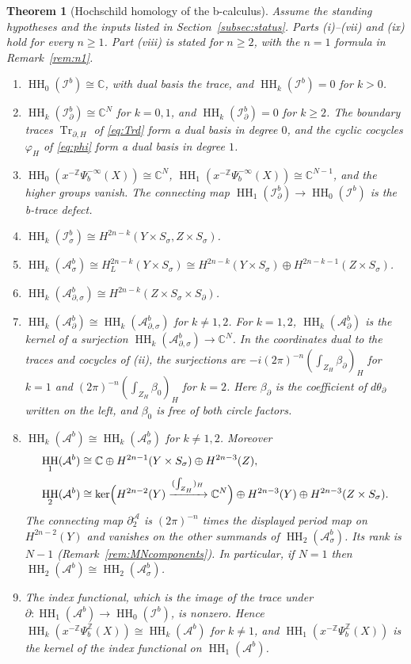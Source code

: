 \documentclass[11pt,oneside,reqno]{article}
\DeclareMathOperator{\HH}{HH}
\newcommand{\C}{\mathbb C}
\newcommand{\Z}{\mathbb Z}
\DeclareMathOperator{\Tr}{Tr}
\newcommand{\Ib}{\mathcal I^b}
\newcommand{\Idb}{\mathcal I^b_\partial}
\newcommand{\Isb}{\mathcal I^b_\sigma}
\newcommand{\Ab}{\mathcal A^b}
\newcommand{\Asb}{\mathcal A^b_\sigma}
\newcommand{\Adb}{\mathcal A^b_\partial}
\newcommand{\Adsb}{\mathcal A^b_{\partial,\sigma}}
\theoremstyle{plain}
\newtheorem{theorem}{Theorem}[section]
\theoremstyle{definition}
\theoremstyle{remark}
\begin{document}
\begin{theorem}[Hochschild homology of the b-calculus]\label{thm:full}
Assume the standing hypotheses and the inputs listed in
Section~\ref{subsec:status}. Parts (i)--(vii) and (ix) hold for every \(n\geq1\).
Part (viii) is stated for \(n\geq2\), with the \(n=1\) formula in
Remark~\ref{rem:n1}.
\begin{enumerate}
\item[(i)] \(\HH_0(\Ib)\cong\C\), with dual basis the trace, and
\(\HH_k(\Ib)=0\) for \(k>0\).
\item[(ii)] \(\HH_k(\Idb)\cong\C^N\) for \(k=0,1\), and \(\HH_k(\Idb)=0\)
for \(k\geq2\). The boundary traces \(\Tr_{\partial,H}\) of \eqref{eq:Trd}
form a dual basis in degree \(0\), and the cyclic cocycles \(\varphi_H\) of
\eqref{eq:phi} form a dual basis in degree \(1\).
\item[(iii)] \(\HH_0(x^{-\Z}\Psi_b^{-\infty}(X))\cong\C^N\),
\(\HH_1(x^{-\Z}\Psi_b^{-\infty}(X))\cong\C^{N-1}\), and the higher groups
vanish. The connecting map \(\HH_1(\Idb)\to\HH_0(\Ib)\) is the b-trace
defect.
\item[(iv)] \(\HH_k(\Isb)\cong H^{2n-k}(Y\times S_\sigma,Z\times
S_\sigma)\).
\item[(v)] \(\HH_k(\Asb)\cong H_L^{2n-k}(Y\times S_\sigma)\cong
H^{2n-k}(Y\times S_\sigma)\oplus H^{2n-k-1}(Z\times S_\sigma)\).
\item[(vi)] \(\HH_k(\Adsb)\cong H^{2n-k}(Z\times S_\sigma\times
S_\partial)\).
\item[(vii)] \(\HH_k(\Adb)\cong\HH_k(\Adsb)\) for \(k\neq1,2\). For
\(k=1,2\), \(\HH_k(\Adb)\) is the kernel of a surjection
\(\HH_k(\Adsb)\to\C^N\). In the coordinates dual to the traces and
cocycles of (ii), the surjections are
\(-i(2\pi)^{-n}(\int_{Z_H}\beta_\partial)_H\) for \(k=1\)
and \((2\pi)^{-n}(\int_{Z_H}\beta_0)_H\) for \(k=2\).
Here \(\beta_\partial\) is the coefficient of \(d\theta_\partial\)
written on the left, and \(\beta_0\) is free of both circle factors.
\item[(viii)] \(\HH_k(\Ab)\cong\HH_k(\Asb)\) for \(k\neq1,2\). Moreover
\begin{align*}
 \HH_1(\Ab)&\cong\C\oplus H^{2n-1}(Y\times S_\sigma)\oplus
 H^{2n-3}(Z),\\
 \HH_2(\Ab)&\cong\ker\Bigl(H^{2n-2}(Y)\xrightarrow{(\int_{Z_H})_H}\C^N
 \Bigr)\oplus H^{2n-3}(Y)\oplus H^{2n-3}(Z\times S_\sigma).
\end{align*}
The connecting map \(\partial^{\mathcal A}_2\) is
\((2\pi)^{-n}\) times the displayed period map on \(H^{2n-2}(Y)\)
and vanishes on the other summands of \(\HH_2(\Asb)\).
Its rank is \(N-1\) (Remark~\ref{rem:MNcomponents}). In particular,
if \(N=1\) then \(\HH_2(\Ab)\cong\HH_2(\Asb)\).
\item[(ix)] The index functional, which is the image of the trace under
\(\partial:\HH_1(\Ab)\to\HH_0(\Ib)\), is nonzero. Hence
\(\HH_k(x^{-\Z}\Psi_b^{\Z}(X))\cong\HH_k(\Ab)\) for \(k\neq1\), and
\(\HH_1(x^{-\Z}\Psi_b^{\Z}(X))\) is the kernel of the index functional on
\(\HH_1(\Ab)\).
\end{enumerate}
\end{theorem}
\end{document}
